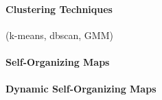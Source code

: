 \paragraph{Clustering Techniques}
(k-means, dbscan, GMM)

\paragraph{Self-Organizing Maps}

\paragraph{Dynamic Self-Organizing Maps}